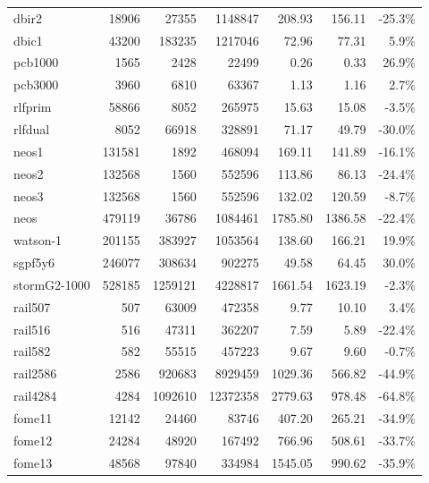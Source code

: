 \begin{small}
\begin{longtable}{|l|rrr|r|r|r|}
dbir2 & 18906 & 27355 & 1148847 & 208.93 & 156.11 & -25.3\% \\
dbic1 & 43200 & 183235 & 1217046 & 72.96 & 77.31 & 5.9\% \\
pcb1000 & 1565 & 2428 & 22499 & 0.26 & 0.33 & 26.9\% \\
pcb3000 & 3960 & 6810 & 63367 & 1.13 & 1.16 & 2.7\% \\
rlfprim & 58866 & 8052 & 265975 & 15.63 & 15.08 & -3.5\% \\
rlfdual & 8052 & 66918 & 328891 & 71.17 & 49.79 & -30.0\% \\
neos1 & 131581 & 1892 & 468094 & 169.11 & 141.89 & -16.1\% \\
neos2 & 132568 & 1560 & 552596 & 113.86 & 86.13 & -24.4\% \\
neos3 & 132568 & 1560 & 552596 & 132.02 & 120.59 & -8.7\% \\
neos & 479119 & 36786 & 1084461 & 1785.80 & 1386.58 & -22.4\% \\
watson-1 & 201155 & 383927 & 1053564 & 138.60 & 166.21 & 19.9\% \\
sgpf5y6 & 246077 & 308634 & 902275 & 49.58 & 64.45 & 30.0\% \\
stormG2-1000 & 528185 & 1259121 & 4228817 & 1661.54 & 1623.19 & -2.3\% \\
rail507 & 507 & 63009 & 472358 & 9.77 & 10.10 & 3.4\% \\
rail516 & 516 & 47311 & 362207 & 7.59 & 5.89 & -22.4\% \\
rail582 & 582 & 55515 & 457223 & 9.67 & 9.60 & -0.7\% \\
rail2586 & 2586 & 920683 & 8929459 & 1029.36 & 566.82 & -44.9\% \\
rail4284 & 4284 & 1092610 & 12372358 & 2779.63 & 978.48 & -64.8\% \\
fome11 & 12142 & 24460 & 83746 & 407.20 & 265.21 & -34.9\% \\
fome12 & 24284 & 48920 & 167492 & 766.96 & 508.61 & -33.7\% \\
fome13 & 48568 & 97840 & 334984 & 1545.05 & 990.62 & -35.9\% \\
\end{longtable} 
\end{small}

